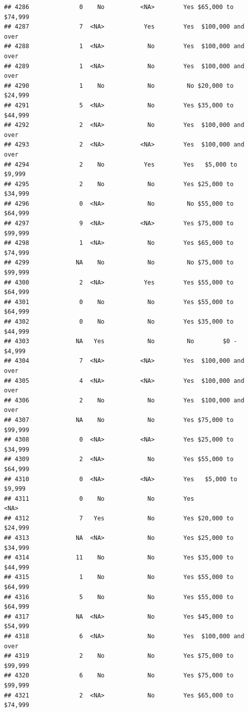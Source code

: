 \documentclass[man]{apa6}
\begin{document}
\begin{verbatim}
## 4286              0    No          <NA>        Yes $65,000 to $74,999
## 4287              7  <NA>           Yes        Yes  $100,000 and over
## 4288              1  <NA>            No        Yes  $100,000 and over
## 4289              1  <NA>            No        Yes  $100,000 and over
## 4290              1    No            No         No $20,000 to $24,999
## 4291              5  <NA>            No        Yes $35,000 to $44,999
## 4292              2  <NA>            No        Yes  $100,000 and over
## 4293              2  <NA>          <NA>        Yes  $100,000 and over
## 4294              2    No           Yes        Yes   $5,000 to $9,999
## 4295              2    No            No        Yes $25,000 to $34,999
## 4296              0  <NA>            No         No $55,000 to $64,999
## 4297              9  <NA>          <NA>        Yes $75,000 to $99,999
## 4298              1  <NA>            No        Yes $65,000 to $74,999
## 4299             NA    No            No         No $75,000 to $99,999
## 4300              2  <NA>           Yes        Yes $55,000 to $64,999
## 4301              0    No            No        Yes $55,000 to $64,999
## 4302              0    No            No        Yes $35,000 to $44,999
## 4303             NA   Yes            No         No        $0 - $4,999
## 4304              7  <NA>          <NA>        Yes  $100,000 and over
## 4305              4  <NA>          <NA>        Yes  $100,000 and over
## 4306              2    No            No        Yes  $100,000 and over
## 4307             NA    No            No        Yes $75,000 to $99,999
## 4308              0  <NA>          <NA>        Yes $25,000 to $34,999
## 4309              2  <NA>            No        Yes $55,000 to $64,999
## 4310              0  <NA>          <NA>        Yes   $5,000 to $9,999
## 4311              0    No            No        Yes               <NA>
## 4312              7   Yes            No        Yes $20,000 to $24,999
## 4313             NA  <NA>            No        Yes $25,000 to $34,999
## 4314             11    No            No        Yes $35,000 to $44,999
## 4315              1    No            No        Yes $55,000 to $64,999
## 4316              5    No            No        Yes $55,000 to $64,999
## 4317             NA  <NA>            No        Yes $45,000 to $54,999
## 4318              6  <NA>            No        Yes  $100,000 and over
## 4319              2    No            No        Yes $75,000 to $99,999
## 4320              6    No            No        Yes $75,000 to $99,999
## 4321              2  <NA>            No        Yes $65,000 to $74,999

\end{verbatim}
\end{document}
